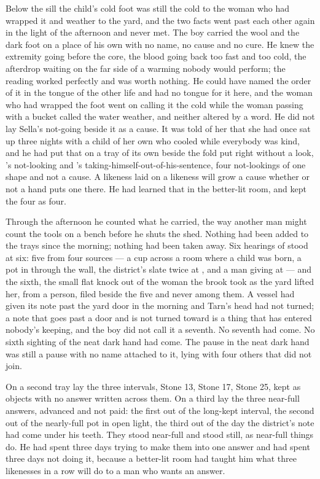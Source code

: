 Below the sill the child's cold foot was still the cold to the woman who had wrapped it and weather to the yard, and the two facts went past each other again in the light of the afternoon and never met. The boy carried the wool and the dark foot on a place of his own with no name, no cause and no cure. He knew the extremity going before the core, the blood going back too fast and too cold, the afterdrop waiting on the far side of a warming nobody would perform; the reading worked perfectly and was worth nothing. He could have named the order of it in the tongue of the other life and had no tongue for it here, and the woman who had wrapped the foot went on calling it the cold while the woman passing with a bucket called the water weather, and neither altered by a word. He did not lay Sella's not-going beside it as a cause. It was told of her that she had once sat up three nights with a child of her own who cooled while everybody was kind, and he had put that on a tray of its own beside the fold put right without a look, 's not-looking and 's taking-himself-out-of-his-sentence, four not-lookings of one shape and not a cause. A likeness laid on a likeness will grow a cause whether or not a hand puts one there. He had learned that in the better-lit room, and kept the four as four.

\scenebreak

Through the afternoon he counted what he carried, the way another man might count the tools on a bench before he shuts the shed. Nothing had been added to the trays since the morning; nothing had been taken away. Six hearings of  stood at six: five from four sources --- a cup across a room where a child was born, a pot in  through the wall, the district's slate twice at , and a man giving at  --- and the sixth, the small flat knock out of the woman the brook took as the yard lifted her, from a person, filed beside the five and never among them. A vessel had given its note past the yard door in the morning and Tarn's head had not turned; a note that goes past a door and is not turned toward is a thing that has entered nobody's keeping, and the boy did not call it a seventh. No seventh had come. No sixth sighting of the neat dark hand had come. The pause in the neat dark hand was still a pause with no name attached to it, lying with four others that did not join.

On a second tray lay the three intervals, Stone 13, Stone 17, Stone 25, kept as objects with no answer written across them. On a third lay the three near-full answers, advanced and not paid: the first out of the long-kept interval, the second out of the nearly-full pot in open light, the third out of the day the district's note had come under his teeth. They stood near-full and stood still, as near-full things do. He had spent three days trying to make them into one answer and had spent three days not doing it, because a better-lit room had taught him what three likenesses in a row will do to a man who wants an answer.

